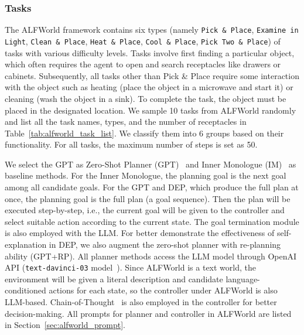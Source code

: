 \documentclass{article}
\begin{document}
\subsubsection{Tasks}
The ALFWorld framework contains six types (namely \texttt{Pick \& Place}, \texttt{Examine in Light}, \texttt{Clean \& Place}, \texttt{Heat \& Place}, \texttt{Cool \& Place}, \texttt{Pick Two \& Place}) of tasks with various difficulty levels. Tasks involve first finding a particular object, which often requires the agent to open and search receptacles like drawers or cabinets. Subsequently, all tasks other than Pick \& Place require some interaction with the object such as heating (place the object in a microwave and start it) or cleaning (wash the object in a sink). To complete the task, the object must be placed in the designated location. We sample 10 tasks from ALFWorld randomly and list all the task names, types, and the number of receptacles in Table~\ref{tab:alfworld_task_list}. We classify them into 6 groups based on their functionality. For all tasks, the maximum number of steps is set as 50.




We select the GPT as Zero-Shot Planner (GPT)~\cite{huang2022language} and Inner Monologue (IM)~\cite{innermonologue} as baseline methods. For the Inner Monologue, the planning goal is the next goal among all candidate goals. For the GPT and DEP, which produce the full plan at once, the planning goal is the full plan (a goal sequence). Then the plan will be executed step-by-step, i.e., the current goal will be given to the controller and select suitable action according to the current state. The goal termination module is also employed with the LLM. For better demonstrate the effectiveness of self-explanation in DEP, we also augment the zero-shot planner with re-planning ability (GPT+RP).
All planner methods access the LLM model through OpenAI API (\texttt{text-davinci-03} model~\cite{gpt3}). Since ALFWorld is a text world, the environment will be given a literal description and candidate language-conditioned actions for each state, so the controller under ALFWorld is also LLM-based. Chain-of-Thought~\cite{chainofthought} is also employed in the controller for better decision-making. All prompts for planner and controller in ALFWorld are listed in Section~\ref{sec:alfworld_prompt}.




\end{document}
